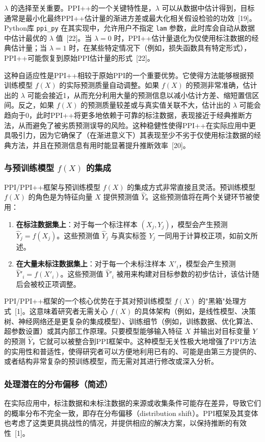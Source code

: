\documentclass[12pt,a4paper]{article}
\begin{document}
$\lambda$ 的选择至关重要。PPI++的一个关键特性是，$\lambda$ 可以从数据中估计得到，目标通常是最小化最终PPI++估计量的渐进方差或最大化相关假设检验的功效~{[19]}。Python库 \texttt{ppi\_py} 在其实现中，允许用户不指定 \texttt{lam} 参数，此时库会自动从数据中估计最优的 $\lambda$ 值~{[22]}。当 $\lambda=0$ 时，PPI++估计量退化为仅使用标注数据的经典估计量；当 $\lambda=1$ 时，在某些特定情况下（例如，损失函数具有特定形式），PPI++可能恢复到原始PPI估计量的形式~{[22]}。

这种自适应性是PPI++相较于原始PPI的一个重要优势。它使得方法能够根据预训练模型 $f(X)$ 的实际预测质量自动调整。如果 $f(X)$ 的预测非常准确，估计出的 $\lambda$ 可能会接近1，从而充分利用大量的预测信息以减小估计方差、缩短置信区间。反之，如果 $f(X)$ 的预测质量较差或与真实值关联不大，估计出的 $\lambda$ 可能会趋向于0，此时PPI++将更多地依赖于可靠的标注数据，表现接近于经典推断方法，从而避免了被劣质预测误导的风险。这种稳健性使得PPI++在实际应用中更具吸引力，因为它确保了（在渐进意义下）其表现至少不劣于仅使用标注数据的经典方法，并且在预测信息有用时能显著提升推断效率~{[20]}。

\subsubsection{与预训练模型 $f(X)$ 的集成}
\label{sec:integration_with_fX}
PPI/PPI++框架与预训练模型 $f(X)$ 的集成方式非常直接且灵活。预训练模型 $f(X)$ 的角色是为特征向量 $X$ 提供预测值 $\hat{Y}$。这些预测值将在两个关键环节被使用：
\begin{enumerate}
    \item \textbf{在标注数据集上}：对于每一个标注样本 $(X_j,Y_j)$，模型会产生预测 $\hat{Y}_j=f(X_j)$。这些预测值 $\hat{Y}_j$ 与真实标签 $Y_j$ 一同用于计算校正项，如前文所述。
    \item \textbf{在大量未标注数据集上}：对于每一个未标注样本 $X'_i$，模型会产生预测 $\hat{Y}'_i=f(X'_i)$。这些预测值 $\hat{Y}'_i$ 被用来构建对目标参数的初步估计，该估计随后会被校正项调整。
\end{enumerate}
PPI/PPI++框架的一个核心优势在于其对预训练模型 $f(X)$ 的"黑箱"处理方式~{[1]}。这意味着研究者无需关心 $f(X)$ 的具体架构（例如，是线性模型、决策树、神经网络还是更复杂的集成模型）、训练细节（例如，训练数据、优化算法、超参数设置）或其内部工作原理。只要模型能够输入特征 $X$ 并输出对目标变量 $Y$ 的预测 $\hat{Y}$，它就可以被整合到PPI框架中。这种模型无关性极大地增强了PPI方法的实用性和普适性，使得研究者可以方便地利用已有的、可能是由第三方提供的、或者结构非常复杂的预训练模型，而无需对其进行修改或深入分析。

\subsubsection{处理潜在的分布偏移（简述）}
\label{sec:distribution_shift}
在实际应用中，标注数据和未标注数据的来源或收集条件可能存在差异，导致它们的概率分布不完全一致，即存在分布偏移（distribution shift）。PPI框架及其变体也考虑了这类更具挑战性的情况，并提供相应的解决方案，以保持推断的有效性~{[1]}。
\end{document}
